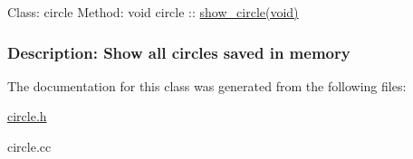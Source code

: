  Class\-: circle Method\-: void circle \-:\-: \hyperlink{classcircle_afdb7bb3662cddd77e7385961ce365f2c}{show\-\_\-circle(void)} \subsubsection*{Description\-: Show all circles saved in memory }

The documentation for this class was generated from the following files\-:\begin{DoxyCompactItemize}
\item 
\hyperlink{circle_8h}{circle.\-h}\item 
circle.\-cc\end{DoxyCompactItemize}
